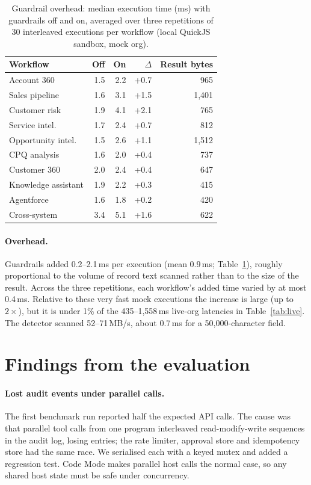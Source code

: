 \documentclass[11pt]{article}
\begin{document}
\begin{table}[t]
\centering\small
\caption{Guardrail overhead: median execution time (ms) with guardrails off and on, averaged over three repetitions of 30 interleaved executions per workflow (local QuickJS sandbox, mock org).}
\label{tab:overhead}
\begin{tabular}{lrrrr}
\toprule
Workflow & Off & On & $\Delta$ & Result bytes\\
\midrule
Account 360 & 1.5 & 2.2 & +0.7 & 965\\
Sales pipeline & 1.6 & 3.1 & +1.5 & 1{,}401\\
Customer risk & 1.9 & 4.1 & +2.1 & 765\\
Service intel. & 1.7 & 2.4 & +0.7 & 812\\
Opportunity intel. & 1.5 & 2.6 & +1.1 & 1{,}512\\
CPQ analysis & 1.6 & 2.0 & +0.4 & 737\\
Customer 360 & 2.0 & 2.4 & +0.4 & 647\\
Knowledge assistant & 1.9 & 2.2 & +0.3 & 415\\
Agentforce & 1.6 & 1.8 & +0.2 & 420\\
Cross-system & 3.4 & 5.1 & +1.6 & 622\\
\bottomrule
\end{tabular}
\end{table}

\paragraph{Overhead.} Guardrails added 0.2--2.1\,ms per execution (mean 0.9\,ms; Table~\ref{tab:overhead}), roughly proportional to the volume of record text scanned rather than to the size of the result. Across the three repetitions, each workflow's added time varied by at most 0.4\,ms. Relative to these very fast mock executions the increase is large (up to $2\times$), but it is under 1\% of the 435--1{,}558\,ms live-org latencies in Table~\ref{tab:live}. The detector scanned 52--71\,MB/s, about 0.7\,ms for a 50{,}000-character field.

\section{Findings from the evaluation}\label{sec:findings}
\paragraph{Lost audit events under parallel calls.} The first benchmark run reported half the expected API calls. The cause was that parallel tool calls from one program interleaved read-modify-write sequences in the audit log, losing entries; the rate limiter, approval store and idempotency store had the same race. We serialised each with a keyed mutex and added a regression test. Code Mode makes parallel host calls the normal case, so any shared host state must be safe under concurrency.
\end{document}
